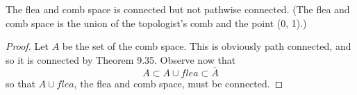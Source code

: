 \documentclass[a4paper,12pt,twoside]{hmcpset}
\begin{document}
\begin{problem}[Theorem 9.36]
    The flea and comb space is connected but not pathwise connected.
    (The flea and comb space is the union of the topologist's comb and
    the point (0, 1).)
\end{problem}

\begin{proof}
    Let $A$ be the set of the comb space. This is obviously path
    connected, and so it is connected by Theorem 9.35. Observe now
    that 
    \[
        A \subset A \cup {flea} \subset \overline{A}
    \]
    so that $A \cup {flea}$, the flea and comb space, must be
    connected. 
\end{proof}
\end{document}
